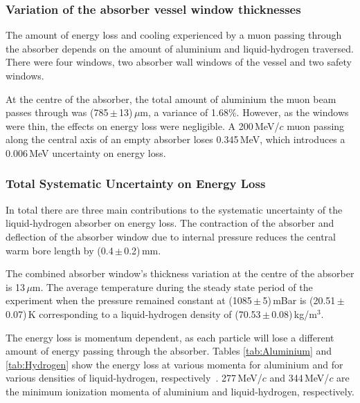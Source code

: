 \subsubsection{Variation of the absorber vessel window thicknesses}
\label{SubSect:Absorber_thickness}

The amount of energy loss and cooling experienced by a muon passing through the absorber depends on the amount of
aluminium and liquid-hydrogen traversed. There were four windows, two absorber wall windows of the vessel and two safety windows.

At the centre of the absorber, the total amount of aluminium the muon beam passes through was (785\,$\mathrm{\pm}$\,13)\,$\mu$m, a variance of 1.68\%. However, as the windows were thin, the effects on energy loss were negligible. A 200\,MeV/$c$ muon passing along the central axis of an empty absorber loses 0.345\,MeV, which introduces a 0.006\,MeV uncertainty on energy loss.


\subsubsection{Total Systematic Uncertainty on Energy Loss}
\label{SubSect:Absorber_total}

In total there are three main contributions to the systematic uncertainty of the liquid-hydrogen absorber on energy loss. The contraction of the absorber and deflection of the absorber window due to internal pressure reduces the central warm bore length by (0.4\,$\mathrm{\pm}$\,0.2)\,mm.

The combined absorber window's thickness variation at the centre of the absorber is 13\,$\mu$m. The average temperature during the steady state period of the experiment when the pressure remained constant at (1085\,$\mathrm{\pm}$\,5)\,mBar is (20.51\,$\mathrm{\pm}$\,0.07)\,K corresponding to a liquid-hydrogen density of (70.53\,$\mathrm{\pm}$\,0.08)\,kg/m$^{3}$.

The energy loss is momentum dependent, as each particle will lose a different amount of energy passing through the absorber. Tables \ref{tab:Aluminium} and \ref{tab:Hydrogen} show the energy loss at various momenta for aluminium and for various densities of liquid-hydrogen, respectively~\cite{AtomicAluminium}\cite{AtomicHydrogen}\cite{MuonAluminium}\cite{MuonliquidHydrogen}.
277\,MeV/$c$ and 344\,MeV/$c$ are the minimum ionization momenta of aluminium and liquid-hydrogen, respectively.


